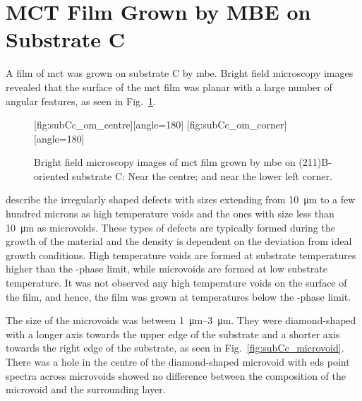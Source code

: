 \clearpage
\section{MCT Film Grown by MBE on  Substrate C}\label{sec:subCc}

A film of \acl{mct} was grown on substrate C by \ac{mbe}. Bright field microscopy images revealed that the surface of the \ac{mct} film was planar with a large number of angular features, as seen in Fig.~\ref{fig:subCc_om}.

\begin{figure}[htbp]
    \centering
    [fig:subCc_om_centre][angle=180]
    \hfill
    [fig:subCc_om_corner][angle=180]
    \caption[Bright field microscopy images of \ac{mct} film grown by \ac{mbe} on substrate C.]{Bright field microscopy images of \ac{mct} film grown by \ac{mbe} on (211)B-oriented substrate C:  Near the centre; and  near the lower left corner.}
    \label{fig:subCc_om}
\end{figure}

\citet{selvig2007defects} describe the irregularly shaped defects with sizes extending from \SI{10}{\micro\metre} to a few hundred microns as high temperature voids and the ones with size less than \SI{10}{\micro\metre} as microvoids. These types of defects are typically formed during the growth of the material and the density is dependent on the deviation from ideal growth conditions. High temperature voids are formed at substrate temperatures higher than the -phase limit, while microvoids are formed at low substrate temperature. It was not observed any high temperature voids on the surface of the film, and hence, the film was grown at temperatures below the -phase limit.


The size of the microvoids was between \SIrange{1}{3}{\micro\metre}. They were diamond-shaped with a longer axis towards the upper edge of the substrate and a shorter axis towards the right edge of the substrate, as seen in Fig.~\ref{fig:subCc_microvoid}. There was a hole in the centre of the diamond-shaped microvoid with  \Ac{eds} point spectra across microvoids showed no difference between the composition of the microvoid and the surrounding layer.  


